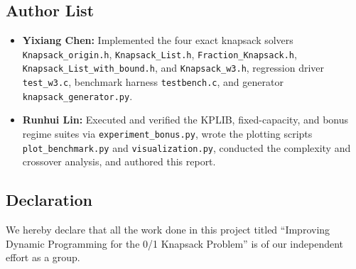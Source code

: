 \documentclass[10pt, a4paper]{article}
\newif\ifpeerreview
\newcommand{\code}[1]{\texttt{\color{primary!90!black}#1}}
\begin{document}
\subsection*{Author List}
{\sloppy
\ifpeerreview
\begin{itemize}
  \item \textbf{\color{primary}Student A:} Implemented the four exact knapsack solvers \code{Knapsack\_origin.h}, \code{Knapsack\_List.h}, \code{Fraction\_Knapsack.h}, \code{Knapsack\_List\_with\_bound.h}, and \code{Knapsack\_w3.h}, regression driver \code{test\_w3.c}, benchmark harness \code{testbench.c}, and generator \code{knapsack\_generator.py}.
  \item \textbf{\color{primary}Student B:} Executed and verified the KPLIB, fixed-capacity, and bonus regime suites via \code{experiment\_bonus.py}, wrote the plotting scripts \code{plot\_benchmark.py} and \code{visualization.py}, conducted the complexity and crossover analysis, and authored this report.
\end{itemize}
\else
\begin{itemize}
  \item \textbf{\color{primary}Yixiang Chen:} Implemented the four exact knapsack solvers \code{Knapsack\_origin.h}, \code{Knapsack\_List.h}, \code{Fraction\_Knapsack.h}, \code{Knapsack\_List\_with\_bound.h}, and \code{Knapsack\_w3.h}, regression driver \code{test\_w3.c}, benchmark harness \code{testbench.c}, and generator \code{knapsack\_generator.py}.
  \item \textbf{\color{primary}Runhui Lin:} Executed and verified the KPLIB, fixed-capacity, and bonus regime suites via \code{experiment\_bonus.py}, wrote the plotting scripts \code{plot\_benchmark.py} and \code{visualization.py}, conducted the complexity and crossover analysis, and authored this report.
\end{itemize}
\fi
}

\subsection*{Declaration}
We hereby declare that all the work done in this project titled ``Improving Dynamic Programming for the 0/1 Knapsack Problem'' is of our independent effort as a group.
\end{document}
